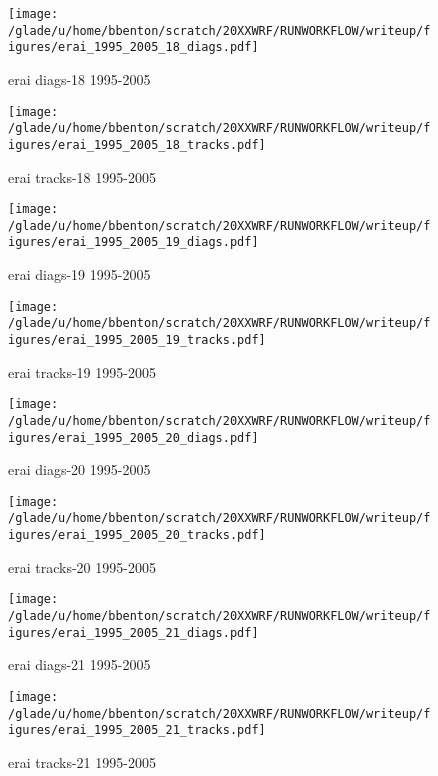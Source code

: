 \begin{figure}[!tbp]
\centering
\begin{minipage}[b]{0.45\textwidth}
\texttt{[image: /glade/u/home/bbenton/scratch/20XXWRF/RUNWORKFLOW/writeup/figures/erai\_1995\_2005\_18\_diags.pdf]}
\caption{erai diags-18 1995-2005}
\end{minipage}
\hfill
\begin{minipage}[b]{0.45\textwidth}
\texttt{[image: /glade/u/home/bbenton/scratch/20XXWRF/RUNWORKFLOW/writeup/figures/erai\_1995\_2005\_18\_tracks.pdf]}
\caption{erai tracks-18 1995-2005}
\end{minipage}
\end{figure}

\clearpage

\begin{figure}[!tbp]
\centering
\begin{minipage}[b]{0.45\textwidth}
\texttt{[image: /glade/u/home/bbenton/scratch/20XXWRF/RUNWORKFLOW/writeup/figures/erai\_1995\_2005\_19\_diags.pdf]}
\caption{erai diags-19 1995-2005}
\end{minipage}
\hfill
\begin{minipage}[b]{0.45\textwidth}
\texttt{[image: /glade/u/home/bbenton/scratch/20XXWRF/RUNWORKFLOW/writeup/figures/erai\_1995\_2005\_19\_tracks.pdf]}
\caption{erai tracks-19 1995-2005}
\end{minipage}
\end{figure}

\begin{figure}[!tbp]
\centering
\begin{minipage}[b]{0.45\textwidth}
\texttt{[image: /glade/u/home/bbenton/scratch/20XXWRF/RUNWORKFLOW/writeup/figures/erai\_1995\_2005\_20\_diags.pdf]}
\caption{erai diags-20 1995-2005}
\end{minipage}
\hfill
\begin{minipage}[b]{0.45\textwidth}
\texttt{[image: /glade/u/home/bbenton/scratch/20XXWRF/RUNWORKFLOW/writeup/figures/erai\_1995\_2005\_20\_tracks.pdf]}
\caption{erai tracks-20 1995-2005}
\end{minipage}
\end{figure}

\begin{figure}[!tbp]
\centering
\begin{minipage}[b]{0.45\textwidth}
\texttt{[image: /glade/u/home/bbenton/scratch/20XXWRF/RUNWORKFLOW/writeup/figures/erai\_1995\_2005\_21\_diags.pdf]}
\caption{erai diags-21 1995-2005}
\end{minipage}
\hfill
\begin{minipage}[b]{0.45\textwidth}
\texttt{[image: /glade/u/home/bbenton/scratch/20XXWRF/RUNWORKFLOW/writeup/figures/erai\_1995\_2005\_21\_tracks.pdf]}
\caption{erai tracks-21 1995-2005}
\end{minipage}
\end{figure}

